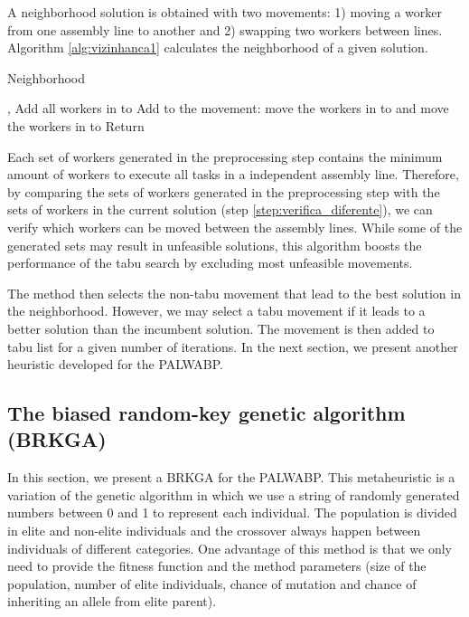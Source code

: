\documentclass{singlecol-new}
\begin{document}
A neighborhood solution is obtained with two movements: 1) moving a worker from one assembly line to another and 2) swapping two workers between lines. Algorithm \ref{alg:vizinhanca1} calculates the neighborhood of a given solution.

\begin{algorithm}[!ht]
\caption{Neighborhood}
\label{alg:vizinhanca1}
\begin{algorithmic}[1]
\REQUIRE 
\FORALL{}
	\FORALL{}
		\STATE , 
		\IF{}\label{step:verifica_diferente}
			\IF{}
				\STATE Add all workers in  to \label{step:movimento_simples}
			\ELSE
				\FORALL{}
						\STATE Add to  the movement: move the workers in  to  and move the workers in  to \label{step:movimento_troca}
					\ENDIF
				\ENDFOR
			\ENDIF
		\ENDIF
	\ENDFOR
\ENDFOR
\STATE Return 
\end{algorithmic}
\end{algorithm}

Each set of workers generated in the preprocessing step contains the minimum amount of workers to execute all tasks in a independent assembly line. Therefore, by comparing the sets of workers generated in the preprocessing step with the sets of workers in the current solution (step \ref{step:verifica_diferente}), we can verify which workers can be moved between the assembly lines. While some of the generated sets may result in unfeasible solutions, this algorithm boosts the performance of the tabu search by excluding most unfeasible movements.

The method then selects the non-tabu movement that lead to the best solution in the neighborhood. However, we may select a tabu movement if it leads to a better solution than the incumbent solution. The movement is then added to tabu list for a given number of iterations. In the next section, we present another heuristic developed for the PALWABP.

\subsection{The biased random-key genetic algorithm (BRKGA)}\label{brkga}

In this section, we present a BRKGA for the PALWABP. This metaheuristic is a variation of the genetic algorithm in which we use a string of randomly generated numbers between 0 and 1 to represent each individual. The population is divided in elite and non-elite individuals and the crossover always happen between individuals of different categories. One advantage of this method is that we only need to provide the fitness function and the method parameters (size of the population, number of elite individuals, chance of mutation and chance of inheriting an allele from elite parent).
\end{document}
